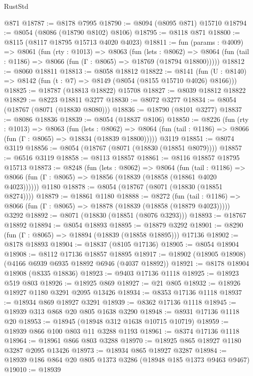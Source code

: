 \begin{lexlean}{RustStd}
\begin{coremodule}
    @871
@18787 := @8178 @7995
@18790 := @8094 (@8095 @871) @15710
@18794 := @8054 (@8086 (@18790 @8102) @8106)
@18795 := @8118 @871
@18800 := @8115 (@8117 @18795 @15713 @4020 @4023)
@18811 := fun (params : @4009) =>
  @8061
    (fun (rty : @1013) =>
    @8063
      (fun (lets : @8062) =>
      @8064 (fun (tail : @1186) => @8066 (fun (Γ : @8065) => @18769 (@18794 @18800)))))
@18812 := @8060 @18811
@18813 := @8058 @18812
@18822 := @8141
    (fun (U : @8140) => @8142 (fun (t : @7) => @8149 (@8054 (@8155 @15710 @4026) @8166)))
@18825 := @18787 (@18813 @18822) @15708
@18827 := @8039 @18812 @18822
@18829 := @8223 @18811 @3277
@18830 := @8072 @3277
@18834 := @8054 (@18767 (@8071 (@18830 @8080)))
@18836 := @18790 (@8101 @3277)
@18837 := @8086 @18836
@18839 := @8054 (@18837 @8106)
@18850 := @8226
    (fun (rty : @1013) =>
    @8063
      (fun (lets : @8062) =>
      @8064 (fun (tail : @1186) => @8066 (fun (Γ : @8065) => @18834 (@18839 @18800)))))
    @3119
@18851 := @8074 @3119
@18856 := @8054 (@18767 (@8071 (@18830 (@18851 @8079))))
@18857 := @6516 @3119
@18858 := @8113 @18857
@18861 := @8116 @18857 @18795 @15713
@18873 := @8248
    (fun (lets : @8062) =>
    @8064
      (fun (tail : @1186) =>
      @8066 (fun (Γ : @8065) => @18856 (@18839 (@18858 (@18861 @4020 @4023))))))
    @1180
@18878 := @8054 (@18767 (@8071 (@18830 (@18851 @8274))))
@18879 := @18861 @1180
@18888 := @8272
    (fun (tail : @1186) => @8066 (fun (Γ : @8065) => @18878 (@18839 (@18858 (@18879 @4023)))))
    @3292
@18892 := @8071 (@18830 (@18851 (@8076 @3293)))
@18893 := @18767 @18892
@18894 := @8054 @18893
@18895 := @18879 @3292
@18901 := @8290 (fun (Γ : @8065) => @18894 (@18839 (@18858 @18895))) @17136
@18902 := @8178 @18893
@18904 := @18837 (@8105 @17136)
@18905 := @8054 @18904
@18908 := @8112 @17136 @18857 @18895
@18917 := @18902 (@18905 @18908) (@4166 @6939 @6935 @18892 @6946 (@4037 @18892))
@18921 := @8178 @18904 @18908 (@8335 @18836)
@18923 := @9403 @17136 @1118
@18925 := @18923 @519 @803
@18926 := @18925 @869
@18927 := @21 @805
@18932 := @18926 @18927 @1180 @3291 @2095 @13426
@18934 := @8353 @17136 @1118
@18937 := @18934 @869 @18927 @3291
@18939 := @8362 @17136 @1118
@18945 := @18939 @313 @868 @20 @805 @1638 @3290
@18948 := @8931 @17136 @1118 @20
@18953 := @18945 (@18948 @312 @1638 @10715 @10719)
@18959 := @18939 @866 @100 @803 @11 @3288 @1193
@18961 := @8374 @17136 @1118
@18964 := @18961 @866 @803 @3288
@18970 := @18925 @865 @18927 @1180 @3287 @2095 @13426
@18973 := @18934 @865 @18927 @3287
@18984 := @18939 @186 @864 @20 @805 @1373 @3286 (@18948 @185 @1373 @9463 @9467)
@19010 := @18939

\end{coremodule}
\end{lexlean}
